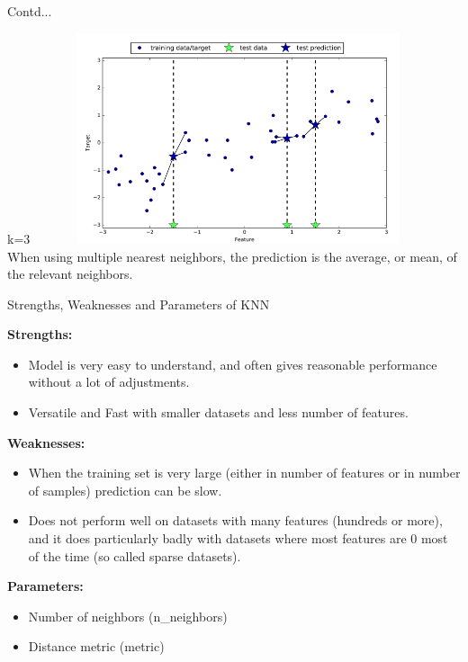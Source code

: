 \documentclass{beamer}
\newcommand\myheading[1]{%
  \par\bigskip
  {\Large\bfseries#1}\par\smallskip}
\begin{document}
\begin{frame}{Contd...}
\begin{flushleft}
k=3
\includegraphics[height= 6.2cm, width=12cm]{KNN_example4}\\
When using
multiple nearest neighbors, the prediction is the average, or mean, of the relevant neighbors.
	\end{flushleft}
\end{frame}
\begin{frame}{Strengths, Weaknesses and Parameters of KNN}
\begin{flushleft}
\myheading{Strengths:}
	\begin{itemize}
		\item Model is very easy to understand, and often gives reasonable performance without a lot of adjustments.
		\item Versatile and Fast with smaller datasets and less number of features. 
	\end{itemize}
\myheading{Weaknesses:}
	\begin{itemize}
	\item When the training set is very large (either in number of features or in number of samples) prediction can be slow.
	\item Does not perform well on datasets with many features
	(hundreds or more), and it does particularly badly with datasets where most features are 0 most of the time (so called sparse datasets).
	\end{itemize}
\myheading{Parameters:}
	\begin{itemize}
		\item Number of neighbors (n\_neighbors)
		\item Distance metric (metric)
	\end{itemize}
\end{flushleft}
\end{frame}
\end{document}

